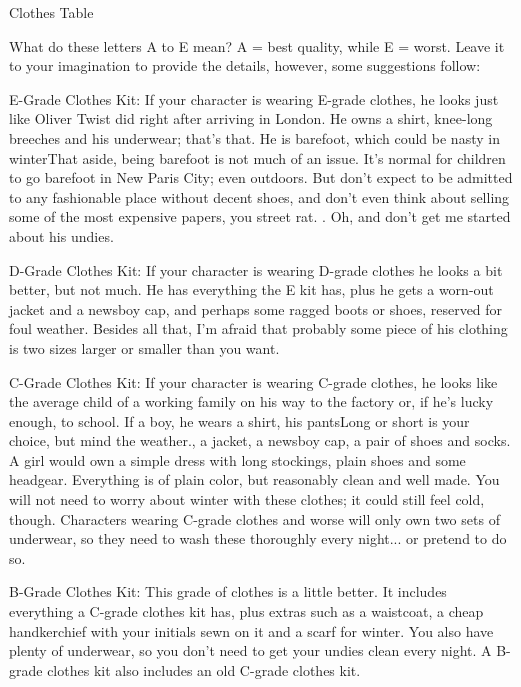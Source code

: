      Clothes Table      






          






What do these letters A to E mean? A = best quality, while E = worst. Leave it to your imagination to provide the details, however, some suggestions follow:


E-Grade Clothes Kit: If your character is wearing E-grade clothes, he looks just like Oliver Twist did right after arriving in London. He owns a shirt, knee-long breeches and his underwear; that's that. He is barefoot, which could be nasty in winterThat aside, being barefoot is not much of an issue. It's normal for children to go barefoot in New Paris City; even outdoors. But don't expect to be admitted to any fashionable place without decent shoes, and don't even think about selling some of the most expensive papers, you street rat. . Oh, and don't get me started about his undies. 


D-Grade Clothes Kit: If your character is wearing D-grade clothes he looks a bit better, but not much. He has everything the E kit has, plus he gets a worn-out jacket and a newsboy cap, and perhaps some ragged boots or shoes, reserved for foul weather. Besides all that, I'm afraid that probably some piece of his clothing is two sizes larger or smaller than you want.


C-Grade Clothes Kit: If your character is wearing C-grade clothes, he looks like the average child of a working family on his way to the factory or, if he's lucky enough, to school. If a boy, he wears a shirt, his pantsLong or short is your choice, but mind the weather., a jacket, a newsboy cap, a pair of shoes and socks. A girl would own a simple dress with long stockings, plain shoes and some headgear. Everything is of plain color, but reasonably clean and well made. You will not need to worry about winter with these clothes; it could still feel cold, though. Characters wearing C-grade clothes and worse will only own two sets of underwear, so they need to wash these thoroughly every night... or pretend to do so.


B-Grade Clothes Kit: This grade of clothes is a little better. It includes everything a C-grade clothes kit has, plus extras such as a waistcoat, a cheap handkerchief with your initials sewn on it and a scarf for winter. You also have plenty of underwear, so you don't need to get your undies clean every night. A B-grade clothes kit also includes an old C-grade clothes kit.


